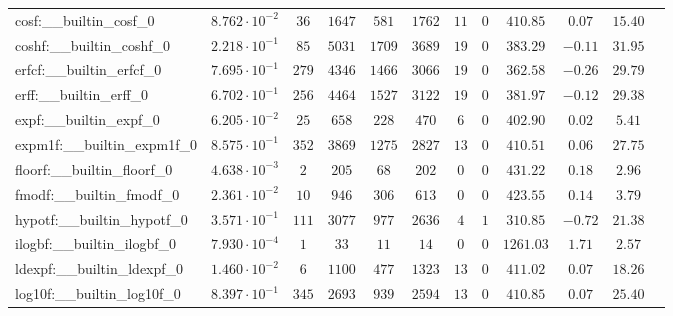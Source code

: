 \begin{tabular}{|l|c|c|c|c|c|c|c|c|c|c|c|}
cosf:\_\_builtin\_cosf\_0                 & $ 8.762 \cdot 10^{-2} $ & $ 36     $ & $ 1647  $ & $ 581   $ & $ 1762  $ & $ 11  $ & $ 0 $ & $ 410.85      $ & $ 0.07    $ & $ 15.40   $ \\
coshf:\_\_builtin\_coshf\_0               & $ 2.218 \cdot 10^{-1} $ & $ 85     $ & $ 5031  $ & $ 1709  $ & $ 3689  $ & $ 19  $ & $ 0 $ & $ 383.29      $ & $ -0.11   $ & $ 31.95   $ \\
erfcf:\_\_builtin\_erfcf\_0               & $ 7.695 \cdot 10^{-1} $ & $ 279    $ & $ 4346  $ & $ 1466  $ & $ 3066  $ & $ 19  $ & $ 0 $ & $ 362.58      $ & $ -0.26   $ & $ 29.79   $ \\
erff:\_\_builtin\_erff\_0                 & $ 6.702 \cdot 10^{-1} $ & $ 256    $ & $ 4464  $ & $ 1527  $ & $ 3122  $ & $ 19  $ & $ 0 $ & $ 381.97      $ & $ -0.12   $ & $ 29.38   $ \\
expf:\_\_builtin\_expf\_0                 & $ 6.205 \cdot 10^{-2} $ & $ 25     $ & $ 658   $ & $ 228   $ & $ 470   $ & $ 6   $ & $ 0 $ & $ 402.90      $ & $ 0.02    $ & $ 5.41    $ \\
expm1f:\_\_builtin\_expm1f\_0             & $ 8.575 \cdot 10^{-1} $ & $ 352    $ & $ 3869  $ & $ 1275  $ & $ 2827  $ & $ 13  $ & $ 0 $ & $ 410.51      $ & $ 0.06    $ & $ 27.75   $ \\
floorf:\_\_builtin\_floorf\_0             & $ 4.638 \cdot 10^{-3} $ & $ 2      $ & $ 205   $ & $ 68    $ & $ 202   $ & $ 0   $ & $ 0 $ & $ 431.22      $ & $ 0.18    $ & $ 2.96    $ \\
fmodf:\_\_builtin\_fmodf\_0               & $ 2.361 \cdot 10^{-2} $ & $ 10     $ & $ 946   $ & $ 306   $ & $ 613   $ & $ 0   $ & $ 0 $ & $ 423.55      $ & $ 0.14    $ & $ 3.79    $ \\
hypotf:\_\_builtin\_hypotf\_0             & $ 3.571 \cdot 10^{-1} $ & $ 111    $ & $ 3077  $ & $ 977   $ & $ 2636  $ & $ 4   $ & $ 1 $ & $ 310.85      $ & $ -0.72   $ & $ 21.38   $ \\
ilogbf:\_\_builtin\_ilogbf\_0             & $ 7.930 \cdot 10^{-4} $ & $ 1      $ & $ 33    $ & $ 11    $ & $ 14    $ & $ 0   $ & $ 0 $ & $ 1261.03     $ & $ 1.71    $ & $ 2.57    $ \\
ldexpf:\_\_builtin\_ldexpf\_0             & $ 1.460 \cdot 10^{-2} $ & $ 6      $ & $ 1100  $ & $ 477   $ & $ 1323  $ & $ 13  $ & $ 0 $ & $ 411.02      $ & $ 0.07    $ & $ 18.26   $ \\
log10f:\_\_builtin\_log10f\_0             & $ 8.397 \cdot 10^{-1} $ & $ 345    $ & $ 2693  $ & $ 939   $ & $ 2594  $ & $ 13  $ & $ 0 $ & $ 410.85      $ & $ 0.07    $ & $ 25.40   $ \\

\end{tabular}
